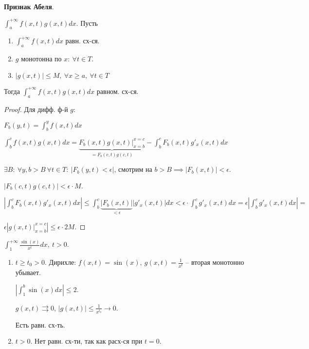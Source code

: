 \begin{theorem}
    \textbf{Признак Абеля}.

    $\int_{a}^{+\infty} { f(x, t) g(x, t) dx }$. Пусть 
    
    \begin{enumerate}
        \item {
            $\int_{a}^{+\infty} { f(x, t) dx }$ равн. сх-ся.
        }
        \item {
            $g$ монотонна по $x: \ \forall t \in T$. 
        }
        \item {
            $| g(x, t) | \leq M, \ \forall x \geq a, \ \forall t \in T$
        }
    \end{enumerate}

    Тогда $\int_{a}^{+\infty} { f(x, t) g(x, t) dx }$ равном. сх-ся.
\end{theorem}
\begin{proof}
    Для дифф. ф-й $g$:

    $F_b (y, t) = \int_{b}^{y} { f(x, t) dx }$

    $\int_{b}^{c} { f(x, t) g(x, t) dx } = \underbrace{F_b (x, t) g(x, t) |_{x=b}^{x=c}}_{= F_b(c, t) g(c, t)} - \int_b^{c} { F_b(x, t) g'_x(x, t) dx }$

    $\exists B : \ \forall y, b > B \ \forall t \in T: \ \left| F_b(y, t) < \epsilon \right|$, смотрим на $b > B \implies |F_b(x, t)| < \epsilon$.

    $|F_b(c, t) g(c, t)| < \epsilon \cdot M$.

    $\left| \int_{b}^{c} { F_b(x, t) g'_x(x, t) dx } \right| \leq \int_{b}^{c} { \underbrace{|F_b(x, t)|}_{< \epsilon} |g'_x(x, t)| dx} < \epsilon \cdot \int_{b}^{c} { g'_x(x, t) dx } = \epsilon \left| \int_{b}^{c} { g'_x(x, t) d x } \right| =$
    
    $ \epsilon \left| g(x, t)|_{x=b}^{x=c}  \right| \leq \epsilon \cdot 2 M$.
\end{proof}
\begin{example}
    $\int_{1}^{+\infty} { \frac{\sin(x)}{x^t} dx }, \ t > 0$.

    \begin{enumerate}
        \item {
            $t \geq t_0 > 0$. Дирихле: $f(x, t) = \sin(x), \ g(x, t) = \frac{1}{x^t}$ -- вторая монотонно убывает.

            $\left| \int_{1}^{b} { \sin(x) dx } \right| \leq 2$.

            $g(x, t) \rightrightarrows 0$, $|g(x, t)| \leq \frac{1}{x^{t_0}} \rightarrow 0$.

            Есть равн. сх-ть.
        }
        \item {
            $t > 0$. Нет равн. сх-ти, так как расх-ся при $t=0$.
        }
    \end{enumerate}
\end{example}

